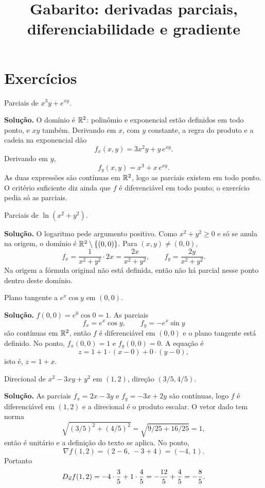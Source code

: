 \documentclass[11pt,a4paper]{article}
\title{Gabarito: derivadas parciais, diferenciabilidade e gradiente}
\author{}
\date{}
\begin{document}
\maketitle
\tableofcontents

\section{Exercícios}

\begin{exercicio}
Parciais de $x^3 y+e^{xy}$.

\textbf{Solução.}
O domínio é $\mathbb{R}^2$: polinômio e exponencial estão definidos em todo ponto, e $xy$ também. Derivando em $x$, com $y$ constante, a regra do produto e a cadeia na exponencial dão
\[
f_x(x,y)=3x^2 y+y\,e^{xy}.
\]
Derivando em $y$,
\[
f_y(x,y)=x^3+x\,e^{xy}.
\]
As duas expressões são contínuas em $\mathbb{R}^2$, logo as parciais existem em todo ponto. O critério suficiente diz ainda que $f$ é diferenciável em todo ponto; o exercício pedia só as parciais.
\end{exercicio}

\begin{exercicio}
Parciais de $\ln(x^2+y^2)$.

\textbf{Solução.}
O logaritmo pede argumento positivo. Como $x^2+y^2\ge 0$ e só se anula na origem, o domínio é $\mathbb{R}^2\setminus\{(0,0)\}$. Para $(x,y)\neq(0,0)$,
\[
f_x=\frac{1}{x^2+y^2}\cdot 2x=\frac{2x}{x^2+y^2},\qquad
f_y=\frac{2y}{x^2+y^2}.
\]
Na origem a fórmula original não está definida, então não há parcial nesse ponto dentro deste domínio.
\end{exercicio}

\begin{exercicio}
Plano tangente a $e^x\cos y$ em $(0,0)$.

\textbf{Solução.}
$f(0,0)=e^0\cos 0=1$. As parciais
\[
f_x=e^x\cos y,\qquad f_y=-e^x\sin y
\]
são contínuas em $\mathbb{R}^2$, então $f$ é diferenciável em $(0,0)$ e o plano tangente está definido. No ponto, $f_x(0,0)=1$ e $f_y(0,0)=0$. A equação é
\[
z=1+1\cdot(x-0)+0\cdot(y-0),
\]
isto é, $z=1+x$.
\end{exercicio}

\begin{exercicio}
Direcional de $x^2-3xy+y^2$ em $(1,2)$, direção $(3/5,4/5)$.

\textbf{Solução.}
As parciais $f_x=2x-3y$ e $f_y=-3x+2y$ são contínuas, logo $f$ é diferenciável em $(1,2)$ e a direcional é o produto escalar. O vetor dado tem norma
\[
\sqrt{(3/5)^2+(4/5)^2}=\sqrt{9/25+16/25}=1,
\]
então é unitário e a definição do texto se aplica. No ponto,
\[
\nabla f(1,2)=(2-6,\,-3+4)=(-4,\,1).
\]
Portanto
\[
D_{\vec{u}} f(1,2)=-4\cdot\frac{3}{5}+1\cdot\frac{4}{5}=-\frac{12}{5}+\frac{4}{5}=-\frac{8}{5}.
\]
\end{exercicio}
\end{document}
